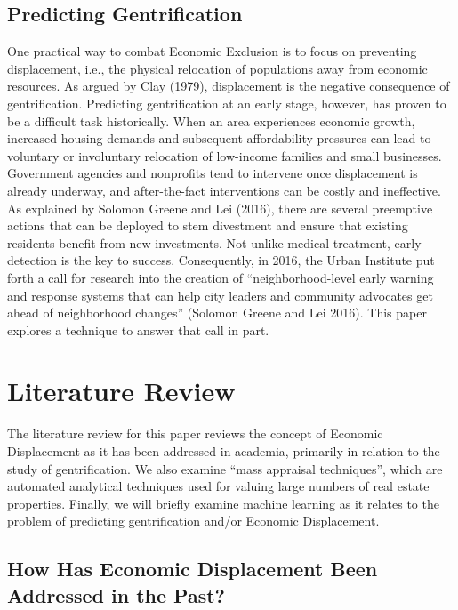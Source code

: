 \documentclass[]{article}
\begin{document}
\subsection{Predicting Gentrification}\label{predicting-gentrification}

One practical way to combat Economic Exclusion is to focus on preventing
displacement, i.e., the physical relocation of populations away from
economic resources. As argued by Clay (1979), displacement is the
negative consequence of gentrification. Predicting gentrification at an
early stage, however, has proven to be a difficult task historically.
When an area experiences economic growth, increased housing demands and
subsequent affordability pressures can lead to voluntary or involuntary
relocation of low-income families and small businesses. Government
agencies and nonprofits tend to intervene once displacement is already
underway, and after-the-fact interventions can be costly and
ineffective. As explained by Solomon Greene and Lei (2016), there are
several preemptive actions that can be deployed to stem divestment and
ensure that existing residents benefit from new investments. Not unlike
medical treatment, early detection is the key to success. Consequently,
in 2016, the Urban Institute put forth a call for research into the
creation of ``neighborhood-level early warning and response systems that
can help city leaders and community advocates get ahead of neighborhood
changes'' (Solomon Greene and Lei 2016). This paper explores a technique
to answer that call in part.

\section{Literature Review}\label{literature-review}

The literature review for this paper reviews the concept of Economic
Displacement as it has been addressed in academia, primarily in relation
to the study of gentrification. We also examine ``mass appraisal
techniques'', which are automated analytical techniques used for valuing
large numbers of real estate properties. Finally, we will briefly
examine machine learning as it relates to the problem of predicting
gentrification and/or Economic Displacement.

\subsection{How Has Economic Displacement Been Addressed in the
Past?}\label{how-has-economic-displacement-been-addressed-in-the-past}
\end{document}
